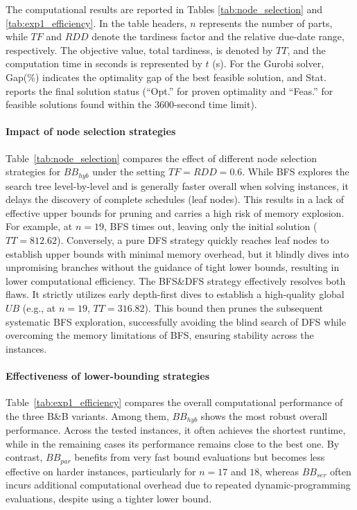 \documentclass[letterpaper, 10 pt, conference]{ieeeconf}  %
\begin{document}
The computational results are reported in Tables \ref{tab:node_selection} and \ref{tab:exp1_efficiency}. In the table headers, $n$ represents the number of parts, while $TF$ and $RDD$ denote the tardiness factor and the relative due-date range, respectively. The objective value, total tardiness, is denoted by $TT$, and the computation time in seconds is represented by $t$ (s). For the Gurobi solver, Gap(\%) indicates the optimality gap of the best feasible solution, and Stat. reports the final solution status (``Opt.'' for proven optimality and ``Feas.'' for feasible solutions found within the 3600-second time limit).

\paragraph{Impact of node selection strategies} Table~\ref{tab:node_selection} compares the effect of different node selection strategies for $BB_{hyb}$ under the setting $TF=RDD=0.6$. While BFS explores the search tree level-by-level and is generally faster overall when solving instances, it delays the discovery of complete schedules (leaf nodes). This results in a lack of effective upper bounds for pruning and carries a high risk of memory explosion. For example, at $n=19$, BFS times out, leaving only the initial solution ($TT=812.62$). Conversely, a pure DFS strategy quickly reaches leaf nodes to establish upper bounds with minimal memory overhead, but it blindly dives into unpromising branches without the guidance of tight lower bounds, resulting in lower computational efficiency. The BFS\&DFS strategy effectively resolves both flaws. It strictly utilizes early depth-first dives to establish a high-quality global $UB$ (e.g., at $n=19$, $TT=316.82$). This bound then prunes the subsequent systematic BFS exploration, successfully avoiding the blind search of DFS while overcoming the memory limitations of BFS, ensuring stability across the instances.

\paragraph{Effectiveness of lower-bounding strategies}
Table~\ref{tab:exp1_efficiency} compares the overall computational performance of the three B\&B variants. Among them, $BB_{hyb}$ shows the most robust overall performance. Across the tested instances, it often achieves the shortest runtime, while in the remaining cases its performance remains close to the best one. By contrast, $BB_{par}$ benefits from very fast bound evaluations but becomes less effective on harder instances, particularly for $n=17$ and $18$, whereas $BB_{ser}$ often incurs additional computational overhead due to repeated dynamic-programming evaluations, despite using a tighter lower bound.
\end{document}
